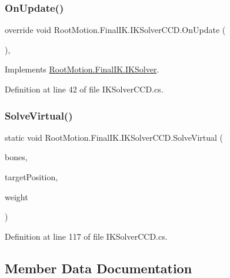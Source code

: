 \subsubsection{\texorpdfstring{On\+Update()}{OnUpdate()}}
{\footnotesize\ttfamily override void Root\+Motion.\+Final\+I\+K.\+I\+K\+Solver\+C\+C\+D.\+On\+Update (\begin{DoxyParamCaption}{ }\end{DoxyParamCaption})\hspace{0.3cm}{\ttfamily [protected]}, {\ttfamily [virtual]}}



Implements \mbox{\hyperlink{class_root_motion_1_1_final_i_k_1_1_i_k_solver_a3bbcc10c91d82ac266dadc63ea93171d}{Root\+Motion.\+Final\+I\+K.\+I\+K\+Solver}}.



Definition at line 42 of file I\+K\+Solver\+C\+C\+D.\+cs.

\mbox{\label{class_root_motion_1_1_final_i_k_1_1_i_k_solver_c_c_d_a9816879c84a69d87e498f3c200110a0d}} 
\subsubsection{\texorpdfstring{Solve\+Virtual()}{SolveVirtual()}}
{\footnotesize\ttfamily static void Root\+Motion.\+Final\+I\+K.\+I\+K\+Solver\+C\+C\+D.\+Solve\+Virtual (\begin{DoxyParamCaption}\item[{\mbox{\hyperlink{class_root_motion_1_1_final_i_k_1_1_i_k_solver_1_1_bone}{I\+K\+Solver.\+Bone}} \mbox{[}$\,$\mbox{]}}]{bones,  }\item[{Vector3}]{target\+Position,  }\item[{float}]{weight }\end{DoxyParamCaption})\hspace{0.3cm}{\ttfamily [static]}}



Definition at line 117 of file I\+K\+Solver\+C\+C\+D.\+cs.



\subsection{Member Data Documentation}
\mbox{\label{class_root_motion_1_1_final_i_k_1_1_i_k_solver_c_c_d_a8dd20d15fc2179df1e1cfb3d476804df}} 
